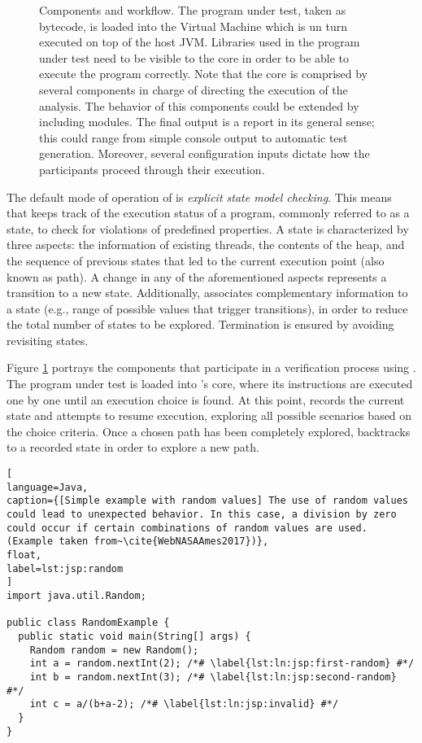 \begin{figure}[t]
\caption[\jpf{} Components and Workflow]{\jpf{} Components and workflow. The program under test, taken as bytecode, is loaded into the \jpf{} Virtual Machine which is un turn executed on top of the host JVM. Libraries used in the program under test need to be visible to the core in order to be able to execute the program correctly. Note that the core is comprised by several components in charge of directing the execution of the analysis. The behavior of this components could be extended by including modules. The final output is a report in its general sense; this could range from simple console output to automatic test generation. Moreover, several configuration inputs dictate how the participants proceed through their execution.}
\label{fig:jpf:process}
\end{figure}

The default mode of operation of \jpf{} is \textit{explicit state model checking}. This means that \jpf{} keeps track of the execution status of a program, commonly referred to as a state, to check for violations of predefined properties. A state is characterized by three aspects: the information of existing threads, the contents of the heap, and the sequence of previous states that led to the current execution point (also known as path). A change in any of the aforementioned aspects represents a transition to a new state. Additionally, \jpf{} associates complementary information to a state (e.g., range of possible values that trigger transitions), in order to reduce the total number of states to be explored. Termination is ensured by avoiding revisiting states.

Figure \ref{fig:jpf:process} portrays the components that participate in a verification process using \jpf{}. The program under test is loaded into \jpf{}'s core, where its instructions are executed one by one until an execution choice is found. At this point, \jpf{} records the current state and attempts to resume execution, exploring all possible scenarios based on the choice criteria. Once a chosen path has been completely explored, \jpf{} backtracks to a recorded state in order to explore a new path.

\begin{lstlisting}[
language=Java,
caption={[Simple example with random values] The use of random values could lead to unexpected behavior. In this case, a division by zero could occur if certain combinations of random values are used. (Example taken from~\cite{WebNASAAmes2017})},
float,
label=lst:jsp:random
]
import java.util.Random;

public class RandomExample {
  public static void main(String[] args) {
    Random random = new Random();
    int a = random.nextInt(2); /*# \label{lst:ln:jsp:first-random} #*/
    int b = random.nextInt(3); /*# \label{lst:ln:jsp:second-random} #*/
    int c = a/(b+a-2); /*# \label{lst:ln:jsp:invalid} #*/
  }
}
\end{lstlisting}

